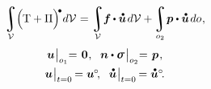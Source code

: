 \begin{otherlanguage}{russian}
\nopagebreak\vspace{-0.8em}\begin{equation}\label{dynamicsoflineartheory:integralofenergy}
\displaystyle\integral\displaylimits_{\mathcal{V}} \hspace{-0.5ex} \left(^{\mathstrut} \hspace{-0.2ex} \mathrm{T} + \Pi \right)^{\hspace{-0.12em}\tikz[baseline=-0.2ex] \draw[black, fill=black] (0,0) circle (.28ex);} \hspace{-0.25ex} d\mathcal{V} \hspace{.1ex} =
\displaystyle\integral\displaylimits_{\mathcal{V}} \hspace{-0.5ex} \bm{f} \hspace{-0.1ex} \dotp \mathdotabove{\bm{u}} \hspace{0.25ex} d\mathcal{V} + \hspace{-0.12ex}
\displaystyle\integral\displaylimits_{o_2} \hspace{-0.32ex} \bm{p} \dotp \mathdotabove{\bm{u}} \hspace{.25ex} do
\hspace{.1ex} ,
\end{equation}
%
\nopagebreak\vspace{-0.2em}\begin{equation*}
\begin{array}{c}
\bm{u} \hspace{.1ex} \bigr|_{o_1} \hspace{-0.64ex} = \hspace{.2ex} \bm{0}
\hspace{.1ex} ,
\hspace{.6em}
%
\bm{n} \dotp \linearstress \hspace{.2ex} \bigr|_{o_2} \hspace{-0.64ex} = \hspace{.2ex} \bm{p}
\hspace{.15ex} ,
\\[.5em]
%
\bm{u} \hspace{.1ex} \bigr|_{t=0} \hspace{-0.2ex} = \bm{u}^{\hspace{-0.1ex}\circ}
\hspace{-0.4ex} ,
\hspace{.6em}
%
\mathdotabove{\bm{u}} \hspace{.1ex} \bigr|_{t=0} \hspace{-0.2ex} = \mathdotabove{\bm{u}}^{\circ}
\hspace{-0.4ex} .
\end{array}
\end{equation*}


\end{otherlanguage}
